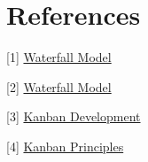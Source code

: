 \section{References}

[1] \href {http://en.wikipedia.org/wiki/Waterfall_model}{Waterfall Model}

[2] \href {http://searchsoftwarequality.techtarget.com/definition/waterfall-model}{Waterfall Model}

[3] \href {http://en.wikipedia.org/wiki/Kanban_(development)}{Kanban Development}

[4] \href {http://www.djaa.com/principles-kanban-method}{Kanban Principles}

